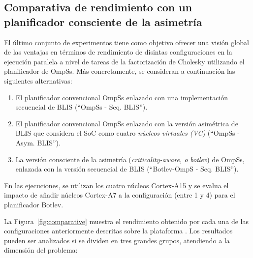 \subsection{Comparativa de rendimiento con un planificador consciente de la asimetría}
\label{sec:comparative}

El último conjunto de experimentos tiene como objetivo ofrecer una visión global de las ventajas en términos
de rendimiento de disintas configuraciones en la ejecución paralela a nivel de tareas de la factorización de
Cholesky utilizando el planificador de OmpSs. Más concretamente, se consideran a continuación las siguientes
alternativas:

\begin{enumerate}

	\item El planificador convencional OmpSs enlazado con una implementación secuencial de BLIS (``OmpSs - Seq. BLIS'').
	\item El planificador convencional OmpSs enlazado con la versión asimétrica de BLIS que considera el SoC como cuatro {\em núcleos virtuales (VC)} (``OmpSs - Asym. BLIS'').
	\item La versión consciente de la asimetría ({\em criticality-aware, o botlev}) de OmpSs, enlazada con la versión secuencial de BLIS (``Botlev-OmpS - Seq. BLIS''). 

\end{enumerate}

En las ejecuciones, se utilizan los cuatro núcleos Cortex-A15 y se evalua el impacto de añadir núcleos 
Cortex-A7 a la configuración (entre 1 y 4) para el planificador Botlev.


La Figura~\ref{fig:comparative} muestra el rendimiento obtenido por cada una de las configuraciones
anteriormente descritas sobre la plataforma \odroid. Los resultados pueden ser analizados si se dividen 
en tres grandes grupos, atendiendo a la dimensión del problema:

